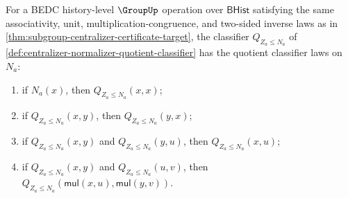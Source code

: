 \begin{theorem}
\label{thm:centralizer-normalizer-quotient-classifier-laws}
For a BEDC history-level $\GroupUp$ operation over $\mathsf{BHist}$ satisfying
the same associativity, unit, multiplication-congruence, and two-sided inverse
laws as in \autoref{thm:subgroup-centralizer-certificate-target}, the
classifier $Q_{Z_a\leq N_a}$ of
\autoref{def:centralizer-normalizer-quotient-classifier} has the quotient
classifier laws on $N_a$:
\begin{enumerate}
\item if $N_a(x)$, then $Q_{Z_a\leq N_a}(x,x)$;
\item if $Q_{Z_a\leq N_a}(x,y)$, then $Q_{Z_a\leq N_a}(y,x)$;
\item if $Q_{Z_a\leq N_a}(x,y)$ and $Q_{Z_a\leq N_a}(y,u)$, then
$Q_{Z_a\leq N_a}(x,u)$;
\item if $Q_{Z_a\leq N_a}(x,y)$ and $Q_{Z_a\leq N_a}(u,v)$, then
$Q_{Z_a\leq N_a}(\mathsf{mul}(x,u),\mathsf{mul}(y,v))$.
\end{enumerate}
\end{theorem}
